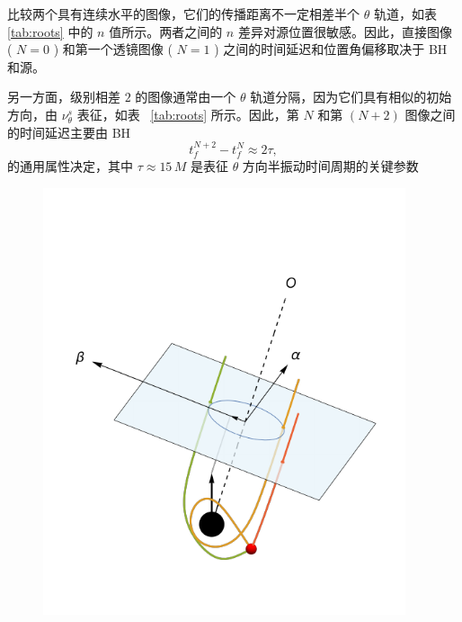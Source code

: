 \documentclass[aps,reprint,superscriptaddress,nofootinbib,floatfix,longbibliography,preprintnumbers]{revtex4-1}
\begin{document}
比较两个具有连续水平的图像，它们的传播距离不一定相差半个    $\theta$    轨道，如表    \ref{tab:roots}    中的    $n$    值所示。两者之间的    $n$    差异对源位置很敏感。因此，直接图像 (   $N = 0$   ) 和第一个透镜图像 (   $N = 1$   ) 之间的时间延迟和位置角偏移取决于 BH 和源。  

另一方面，级别相差    $2$    的图像通常由一个    $\theta$    轨道分隔，因为它们具有相似的初始方向，由    $\nu_\theta^s$    表征，如表~    \ref{tab:roots}    所示。因此，第    $N$    和第    $(N + 2)$    图像之间的时间延迟主要由 BH
   \begin{equation}
t_f^{N+2} - t_f^N \approx 2\tau,
\end{equation}    的通用属性决定，其中    $\tau \approx 15\,M$    是表征    $\theta$    方向半振动时间周期的关键参数  

   \begin{figure}[ht]
    \centering
    \begin{minipage}{0.45\textwidth}
        \includegraphics[width=0.95\textwidth]{figures/3D_demo.pdf}
    \end{minipage}
    \quad
    \begin{minipage}{0.45\textwidth}

\end{minipage}
\end{figure}
\end{document}
